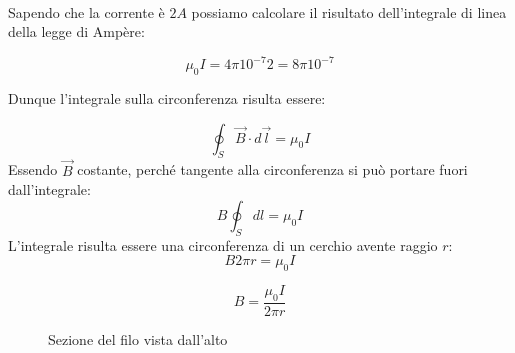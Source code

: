 \paragraph{}
Sapendo che la corrente è $2A$ possiamo calcolare il risultato dell'integrale di linea della legge di Ampère:

\begin{equation*}
    \mu_0I = 4\pi 10^{-7}2 = 8\pi 10^{-7}
\end{equation*}


Dunque l'integrale sulla circonferenza risulta essere:

\begin{equation*}
    \oint_S \vec{B}\cdot d\vec{l} = \mu_0I
\end{equation*}
Essendo $\vec{B}$ costante, perché tangente alla circonferenza si può portare fuori dall'integrale:
\begin{equation*}
    B\oint_S dl = \mu_0I
\end{equation*}
L'integrale risulta essere una circonferenza di un cerchio avente raggio $r$:
\begin{equation}
    B2\pi r = \mu_0I
\end{equation}

\begin{equation*}
    B = \frac{\mu_0I}{2\pi r}
\end{equation*}


\begin{figure}[H]
    \centering
    \caption{Sezione del filo vista dall'alto}
    \label{fig:sezioneFiloMagnetico}
\end{figure}


